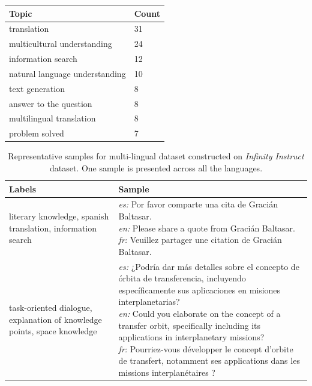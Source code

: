 \begin{appendices}
\begin{table}[t!]
\begin{tabular}{p{6cm} p{1cm}}
    \textbf{Topic} & \textbf{Count} \\
    \midrule

    translation & 31 \\
    multicultural understanding & 24 \\
    information search & 12 \\
    natural language understanding & 10 \\
    text generation & 8 \\
    answer to the question & 8 \\
    multilingual translation & 8 \\
    problem solved & 7 \\

    \bottomrule
    \end{tabular}

    \label{tab:experiments__datasets__infinity_instruct__labels}
    \end{table}

    \begin{table}[t!]
    \centering
    \caption{Representative samples for multi-lingual dataset constructed on \textit{Infinity Instruct} dataset. One sample is presented across all the languages.}

    \begin{tabular}{p{4cm} p{10.5cm}}
    \toprule

    \textbf{Labels} &\textbf{Sample} \\
    \midrule

    literary knowledge, spanish translation, information search & \parbox[t]{\linewidth}{
     \textit{es:} Por favor comparte una cita de Gracián Baltasar.
     \\[0.3em]
     \textit{en:} Please share a quote from Gracián Baltasar.
     \\[0.3em]
     \textit{fr:} Veuillez partager une citation de Gracián Baltasar.
     } \\[0.1em]

    task-oriented dialogue, explanation of knowledge points, space knowledge & \parbox[t]{\linewidth}{
     \textit{es:} ¿Podría dar más detalles sobre el concepto de órbita de transferencia, incluyendo específicamente sus aplicaciones en misiones interplanetarias?
     \\[0.3em]
     \textit{en:} Could you elaborate on the concept of a transfer orbit, specifically including its applications in interplanetary missions?
     \\[0.3em]
     \textit{fr:} Pourriez-vous développer le concept d'orbite de transfert, notamment ses applications dans les missions interplanétaires ?
     } \\[0.1em]


    \bottomrule
    \end{tabular}

    \label{tab:experiments__datasets__infinity_instruct__examples}
    \end{table}

\end{appendices}
